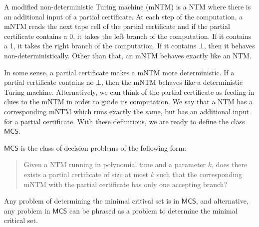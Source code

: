 \documentclass[runningheads,a4paper]{llncs}
\begin{document}
\begin{definition}
A modified non-deterministic Turing machine (mNTM) is a NTM where there is an additional input of a partial certificate. At each step of the computation, a mNTM reads the next tape cell of the partial certificate and if the partial certificate contains a 0, it takes the left branch of the computation. If it contains a 1, it takes the right branch of the computation. If it contains $\bot$, then it behaves non-deterministically. Other than that, an mNTM behaves exactly like an NTM.
\end{definition}

In some sense, a partial certificate makes a mNTM more deterministic. If a partial certificate contains no $\bot$, then the mNTM behaves like a deterministic Turing machine. Alternatively, we can think of the partial certificate as feeding in clues to the mNTM in order to guide its computation. We say that a NTM has a corresponding mNTM which runs exactly the same, but has an additional input for a partial certificate. With these definitions, we are ready to define the class $\mathsf{MCS}$.

\begin{definition}
$\mathsf{MCS}$ is the class of decision problems of the following form:\\
\begin{quote}
Given a NTM running in polynomial time and a parameter $k$, does there exists a partial certificate of size at most $k$ such that the corresponding mNTM with the partial certificate has only one accepting branch?
\end{quote}
\end{definition}

\begin{proposition}
Any problem of determining the minimal critical set is in $\mathsf{MCS}$, and alternative, any problem in $\mathsf{MCS}$ can be phrased as a problem to determine the minimal critical set.
\end{proposition}
\end{document}

